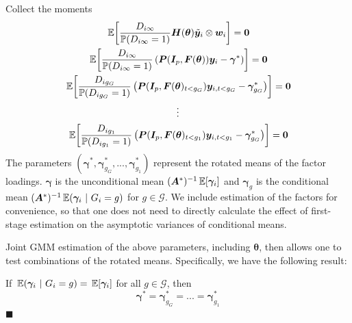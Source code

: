 \documentclass[12pt]{article}
\newcommand{\nick}[1]{\coauthorComment[Nick]{#1}}
\begin{document}
Collect the moments 
\begin{gather*}
    \expec{\frac{D_{i \infty}}{\mathbb{P}(D_{i \infty} = 1)}\bm H(\bm{\theta}) \tilde{\bm y}_i \otimes \bm w_i} = \bm 0\\
    \expec{\frac{D_{i \infty}}{\mathbb{P}(D_{i \infty} = 1)} \left( \bm P(\bm I_p, \bm{F}(\bm{\theta})) \bm y_i - \bm \gamma^* \right)} = \bm 0\\
    \expec{\frac{D_{i g_G}}{\mathbb{P}(D_{ig_G} = 1)} \left( \bm P(\bm I_p, \bm{F}(\bm{\theta})_{t < g_G}) \bm y_{i,t < g_G} - \bm \gamma_{g_G}^* \right) } = \bm 0\\
    \vdots\\
    \expec{\frac{D_{i g_1}}{\mathbb{P}(D_{ig_1} = 1)} \left( \bm P(\bm I_p, \bm{F}(\bm{\theta})_{t < g_1}) \bm y_{i,t < g_1} - \bm \gamma_{g_G}^* \right) } = \bm 0
\end{gather*}
The parameters $(\bm \gamma^*, \bm \gamma_{g_G}^*,...,\bm \gamma_{g_1}^*)$ represent the rotated means of the factor loadings. $\bm \gamma$ is the unconditional mean $(\bm A^*)^{-1}\expec{\bm \gamma_i}$ and $\bm \gamma_g$ is the conditional mean $(\bm A^*)^{-1}\expec{\bm \gamma_i}{G_i = g}$ for $g \in \mathcal{G}$. We include estimation of the factors for convenience, so that one does not need to directly calculate the effect of first-stage estimation on the asymptotic variances of conditional means. 

Joint GMM estimation of the above parameters, including $\bm{\theta}$, then allows one to test combinations of the rotated means. Specifically, we have the following result: 
\begin{theorem}
    If $\expec{\bm \gamma_i}{G_i = g} = \expec{\bm \gamma_i}$ for all $g \in \mathcal{G}$, then
    \begin{equation}
        \bm \gamma^* = \bm \gamma_{g_G}^* = ... = \bm \gamma_{g_1}^*
    \end{equation}
    $\blacksquare$
\end{theorem}




\end{document}
